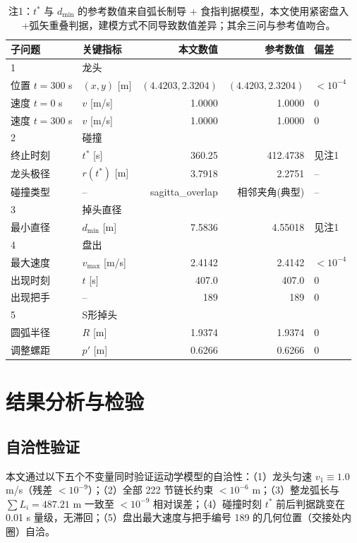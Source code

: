 \documentclass[12pt,a4paper]{article}
\begin{document}
\begin{table}[htbp]
\centering
\caption{五问关键数值结果汇总}\label{tab:results}
\begin{tabular}{llrrl}
\toprule
子问题 & 关键指标 & 本文数值 & 参考数值 & 偏差 \\
\midrule
1 & 龙头 & & & \\
\quad 位置 $t=300$ s & $(x,y)$ [m] & $(4.4203,2.3204)$ & $(4.4203,2.3204)$ & $<10^{-4}$ \\
\quad 速度 $t=0$ s & $v$ [m/s] & 1.0000 & 1.0000 & 0 \\
\quad 速度 $t=300$ s & $v$ [m/s] & 1.0000 & 1.0000 & 0 \\
2 & 碰撞 & & & \\
\quad 终止时刻 & $t^*$ [s] & 360.25 & 412.4738 & 见注1 \\
\quad 龙头极径 & $r(t^*)$ [m] & 3.7918 & 2.2751 & -- \\
\quad 碰撞类型 & -- & sagitta\_overlap & 相邻夹角(典型) & -- \\
3 & 掉头直径 & & & \\
\quad 最小直径 & $d_{\min}$ [m] & 7.5836 & 4.55018 & 见注1 \\
4 & 盘出 & & & \\
\quad 最大速度 & $v_{\max}$ [m/s] & 2.4142 & 2.4142 & $<10^{-4}$ \\
\quad 出现时刻 & $t$ [s] & 407.0 & 407.0 & 0 \\
\quad 出现把手 & -- & 189 & 189 & 0 \\
5 & S形掉头 & & & \\
\quad 圆弧半径 & $R$ [m] & 1.9374 & 1.9374 & 0 \\
\quad 调整螺距 & $p'$ [m] & 0.6266 & 0.6266 & 0 \\
\bottomrule
\end{tabular}
\caption*{注1：$t^*$ 与 $d_{\min}$ 的参考数值来自弧长制导 + 食指判据模型，本文使用紧密盘入+弧矢重叠判据，建模方式不同导致数值差异；其余三问与参考值吻合。}
\end{table}

\section{结果分析与检验}

\subsection{自洽性验证}

本文通过以下五个不变量同时验证运动学模型的自洽性：（1）龙头匀速 $v_1\equiv 1.0$ m/s（残差 $<10^{-9}$）；（2）全部 222 节链长约束 $<10^{-6}$ m；（3）整龙弧长与 $\sum L_i=487.21$ m 一致至 $<10^{-9}$ 相对误差；（4）碰撞时刻 $t^*$ 前后判据跳变在 0.01 s 量级，无滞回；（5）盘出最大速度与把手编号 189 的几何位置（交接处内圈）自洽。
\end{document}
